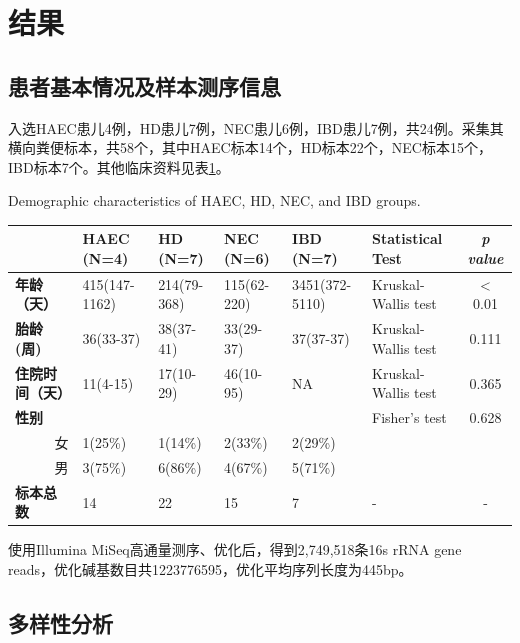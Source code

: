 \section{结果}
  \subsection{患者基本情况及样本测序信息}
  入选HAEC患儿4例，HD患儿7例，NEC患儿6例，IBD患儿7例，共24例。采集其横向粪便标本，共58个，其中HAEC标本14个，HD标本22个，NEC标本15个，IBD标本7个。其他临床资料见表\ref{tab:comparedemographic}。

  \begin{table}[!hpb]
    \centering
      {Demographic characteristics of HAEC, HD, NEC, and IBD groups.}
    \label{tab:comparedemographic}
    \begin{tabular}{lp{1.8cm}p{1.6cm}p{1.8cm}p{1.8cm}p{2cm}c}
      \toprule
         & \textbf{HAEC (N=4)} & \textbf{HD (N=7)} & \textbf{NEC (N=6)} & \textbf{IBD (N=7)} & \textbf{Statistical Test} & \textit{p value} \\ \midrule
        \textbf{年龄（天）} & 415(147-1162) & 214(79-368) & 115(62-220) & 3451(372-5110) & Kruskal-Wallis test & < 0.01 \\
        \textbf{胎龄(周)} & 36(33-37) & 38(37-41) & 33(29-37) & 37(37-37) & Kruskal-Wallis test & 0.111 \\
        \textbf{住院时间（天）} & 11(4-15) & 17(10-29) & 46(10-95) & NA & Kruskal-Wallis test & 0.365 \\
        \textbf{性别} &  &  &  & & Fisher's test & 0.628 \\
        \multicolumn{1}{r}{女} & 1(25\%) & 1(14\%) & 2(33\%) & 2(29\%) &  & \\
        \multicolumn{1}{r}{男} & 3(75\%) & 6(86\%) & 4(67\%) & 5(71\%) &  &\\
        \textbf{标本总数} & 14 & 22 & 15 & 7 & - & - \\
         \bottomrule
    \end{tabular}
  \end{table}

  使用Illumina MiSeq高通量测序、优化后，得到2,749,518条16s rRNA gene reads，优化碱基数目共1223776595，优化平均序列长度为445bp。

  \subsection{多样性分析}
